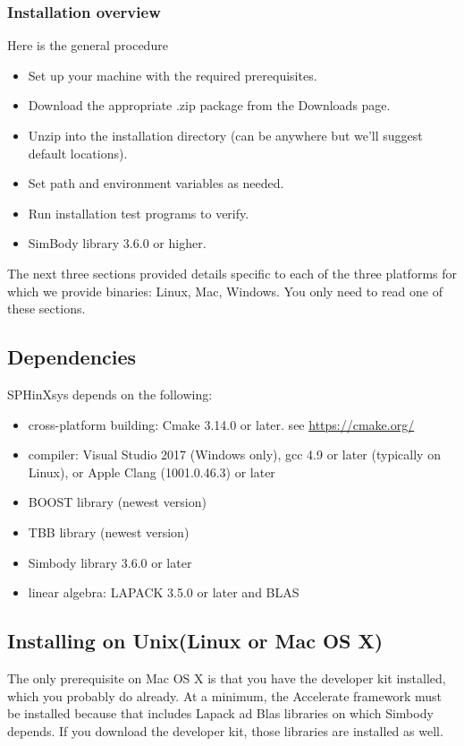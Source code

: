 \documentclass[12pt, a4paper,onecolumn]{article}
\begin{document}
\subsubsection{Installation overview}
Here is the general procedure
\begin{itemize}
	\item Set up your machine with the required prerequisites.
	\item Download the appropriate .zip package from the Downloads page.
	\item  Unzip into the installation directory (can be anywhere but we’ll suggest default locations).
	\item  Set path and environment variables as needed.
	\item  Run installation test programs to verify.
	\item SimBody library 3.6.0 or higher.
\end{itemize}
The next three sections provided details specific to each of the three platforms for which we provide binaries: Linux, Mac, Windows. You only need to read one of these sections.
\subsection{Dependencies}
SPHinXsys depends on the following:
\begin{itemize}
	\item  cross-platform building: Cmake 3.14.0 or later. see \url{https://cmake.org/}
	\item compiler: Visual Studio 2017 (Windows only), gcc 4.9 or later (typically on Linux), or Apple Clang (1001.0.46.3)  or later
	\item BOOST library (newest version)
	\item TBB library (newest version)
	\item Simbody library 3.6.0 or later
	\item linear algebra: LAPACK 3.5.0 or later and BLAS
\end{itemize}
\subsection{Installing on Unix(Linux or Mac OS X)}\label{install-unix}
The only prerequisite on Mac OS X is that you have the developer kit installed, 
which you probably do already.
At a minimum, the Accelerate framework must be installed 
because that includes Lapack ad Blas libraries on which Simbody depends. 
If you download the developer kit, those libraries are installed as well.
\end{document}
